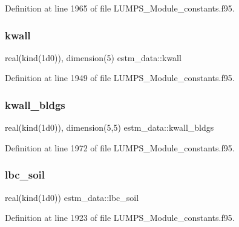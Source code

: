 Definition at line 1965 of file L\+U\+M\+P\+S\+\_\+\+Module\+\_\+constants.\+f95.

\mbox{\label{namespaceestm__data_a47c95a7ea355103f96297323577342aa}} 
\subsubsection{\texorpdfstring{kwall}{kwall}}
{\footnotesize\ttfamily real(kind(1d0)), dimension(5) estm\+\_\+data\+::kwall}



Definition at line 1949 of file L\+U\+M\+P\+S\+\_\+\+Module\+\_\+constants.\+f95.

\mbox{\label{namespaceestm__data_aa4f90c738693b129665f892f3eeb616c}} 
\subsubsection{\texorpdfstring{kwall\+\_\+bldgs}{kwall\_bldgs}}
{\footnotesize\ttfamily real(kind(1d0)), dimension(5,5) estm\+\_\+data\+::kwall\+\_\+bldgs}



Definition at line 1972 of file L\+U\+M\+P\+S\+\_\+\+Module\+\_\+constants.\+f95.

\mbox{\label{namespaceestm__data_a0bedfac15a2049f97e8e052918bdcf5a}} 
\subsubsection{\texorpdfstring{lbc\+\_\+soil}{lbc\_soil}}
{\footnotesize\ttfamily real(kind(1d0)) estm\+\_\+data\+::lbc\+\_\+soil}



Definition at line 1923 of file L\+U\+M\+P\+S\+\_\+\+Module\+\_\+constants.\+f95.

\mbox{\label{namespaceestm__data_a234bc794c013bfddb122adb36d66ccce}} 
